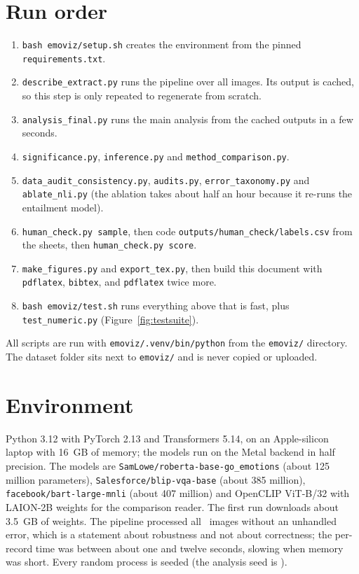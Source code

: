 \begin{sloppypar}
\section{Run order}
\begin{enumerate}\setlength{\itemsep}{1pt}
\item \texttt{bash emoviz/setup.sh} creates the environment from the pinned \texttt{requirements.txt}.
\item \texttt{describe\_extract.py} runs the pipeline over all images. Its output is cached, so this step is only repeated to regenerate from scratch.
\item \texttt{analysis\_final.py} runs the main analysis from the cached outputs in a few seconds.
\item \texttt{significance.py}, \texttt{inference.py} and \texttt{method\_comparison.py}.
\item \texttt{data\_audit\_consistency.py}, \texttt{audits.py}, \texttt{error\_taxonomy.py} and \texttt{ablate\_nli.py} (the ablation takes about half an hour because it re-runs the entailment model).
\item \texttt{human\_check.py sample}, then code \texttt{outputs/human\_check/labels.csv} from the sheets, then \texttt{human\_check.py score}.
\item \texttt{make\_figures.py} and \texttt{export\_tex.py}, then build this document with \texttt{pdflatex}, \texttt{bibtex}, and \texttt{pdflatex} twice more.
\item \texttt{bash emoviz/test.sh} runs everything above that is fast, plus \texttt{test\_numeric.py} (Figure~\ref{fig:testsuite}).
\end{enumerate}
All scripts are run with \texttt{emoviz/.venv/bin/python} from the \texttt{emoviz/} directory. The dataset folder sits next to \texttt{emoviz/} and is never copied or uploaded.

\section{Environment}
Python 3.12 with PyTorch 2.13 and Transformers 5.14, on an Apple-silicon laptop with 16~GB of memory; the models run on the Metal backend in half precision. The models are \texttt{SamLowe/roberta-base-go\_emotions} (about 125 million parameters), \texttt{Salesforce/blip-vqa-base} (about 385 million), \texttt{facebook/bart-large-mnli} (about 407 million) and OpenCLIP ViT-B/32 with LAION-2B weights for the comparison reader. The first run downloads about 3.5~GB of weights. The pipeline processed all \nTotal\ images without an unhandled error, which is a statement about robustness and not about correctness; the per-record time was between about one and twelve seconds, slowing when memory was short. Every random process is seeded (the analysis seed is \nullSeed).


\end{sloppypar}
